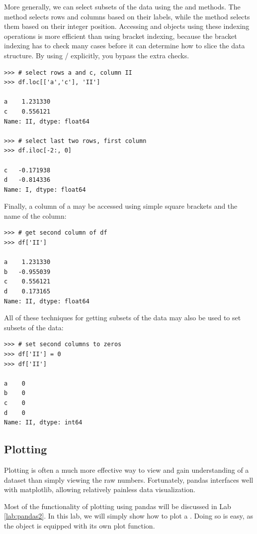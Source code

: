 More generally, we can select subsets of the data using the  and  methods.
The  method selects rows and columns based on their labels, while the  method
selects them based on their integer position.
Accessing  and  objects using these indexing operations is more efficient than using bracket indexing, because the bracket indexing has to check many cases before it can determine how to slice the data structure.
By using / explicitly, you bypass the extra checks.
\begin{lstlisting}
>>> # select rows a and c, column II
>>> df.loc[['a','c'], 'II']

a    1.231330
c    0.556121
Name: II, dtype: float64

>>> # select last two rows, first column
>>> df.iloc[-2:, 0]

c   -0.171938
d   -0.814336
Name: I, dtype: float64
\end{lstlisting}
Finally, a column of a  may be accessed using simple square brackets and the name of the column:
\begin{lstlisting}
>>> # get second column of df
>>> df['II']

a    1.231330
b   -0.955039
c    0.556121
d    0.173165
Name: II, dtype: float64
\end{lstlisting}

All of these techniques for getting subsets of the data may also be used to set subsets of the data:
\begin{lstlisting}
>>> # set second columns to zeros
>>> df['II'] = 0
>>> df['II']

a    0
b    0
c    0
d    0
Name: II, dtype: int64
\end{lstlisting}

\subsection*{Plotting}
Plotting is often a much more effective way to view and gain understanding of a dataset than simply
viewing the raw numbers. Fortunately, pandas interfaces well with matplotlib, allowing relatively
painless data visualization.

Most of the functionality of plotting using pandas will be discussed in Lab \ref{lab:pandas2}.  In this lab, we will simply show how to plot a . Doing so is easy, as the  object is equipped with its own plot
function.

